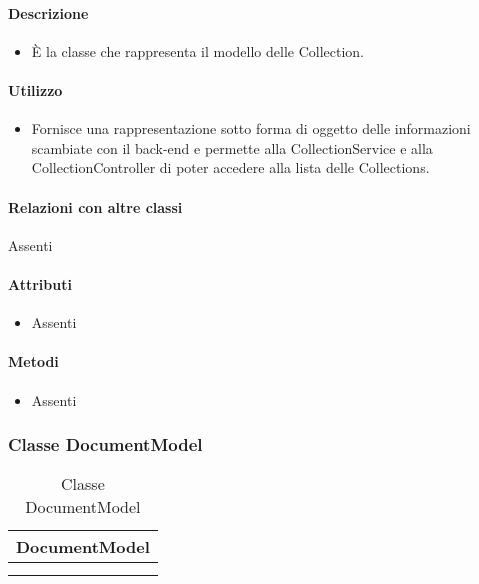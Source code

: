 \paragraph*{Descrizione}
\begin{itemize}
\item[] È la classe che rappresenta il modello delle Collection.
\end{itemize}

\paragraph*{Utilizzo}
\begin{itemize}
\item[] Fornisce una rappresentazione sotto forma di oggetto delle informazioni scambiate con il back-end e permette alla CollectionService e alla CollectionController di poter accedere alla lista delle Collections.
\end{itemize}

\paragraph*{Relazioni con altre classi}
Assenti

\paragraph*{Attributi}
\begin{itemize}
\item[] Assenti
\end{itemize}

\paragraph*{Metodi}
\begin{itemize}
\item[] Assenti
\end{itemize}

\subsubsection{Classe DocumentModel}

\begin{table}[ht]
\begin{center}
\bgroup
\setlength{\arrayrulewidth}{0.6mm}
\def\arraystretch{1}
\begin{tabular}{ | p{12cm} | }
\hline
\centerline{\textbf{DocumentModel}}
\\ \hline
 \\ 
\hline
 \\ 
\hline
\end{tabular}
\egroup
\caption{Classe DocumentModel}
\end{center}
\end{table}

